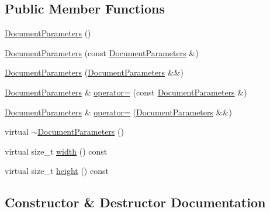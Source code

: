 \subsection*{Public Member Functions}
\begin{DoxyCompactItemize}
\item 
\hyperlink{classGraphicalEditorCore_1_1DocumentParameters_a89df3a7acba401ec3c636d599d40341f}{Document\+Parameters} ()
\item 
\hyperlink{classGraphicalEditorCore_1_1DocumentParameters_ad34fb74cda0ad52bc38678875ce32c91}{Document\+Parameters} (const \hyperlink{classGraphicalEditorCore_1_1DocumentParameters}{Document\+Parameters} \&)
\item 
\hyperlink{classGraphicalEditorCore_1_1DocumentParameters_af797b5c95963fdafdd2253bb4d152c21}{Document\+Parameters} (\hyperlink{classGraphicalEditorCore_1_1DocumentParameters}{Document\+Parameters} \&\&)
\item 
\hyperlink{classGraphicalEditorCore_1_1DocumentParameters}{Document\+Parameters} \& \hyperlink{classGraphicalEditorCore_1_1DocumentParameters_a084ca6d2aafc7e65b401b2e62b0a16e4}{operator=} (const \hyperlink{classGraphicalEditorCore_1_1DocumentParameters}{Document\+Parameters} \&)
\item 
\hyperlink{classGraphicalEditorCore_1_1DocumentParameters}{Document\+Parameters} \& \hyperlink{classGraphicalEditorCore_1_1DocumentParameters_a947b1cc43448286d07300fd7b9eeb722}{operator=} (\hyperlink{classGraphicalEditorCore_1_1DocumentParameters}{Document\+Parameters} \&\&)
\item 
virtual \hyperlink{classGraphicalEditorCore_1_1DocumentParameters_a4ea3a0d935da5c124d9989fd686d6d70}{$\sim$\+Document\+Parameters} ()
\item 
virtual size\+\_\+t \hyperlink{classGraphicalEditorCore_1_1DocumentParameters_af84100459d1e49474e57e5b7b16f1750}{width} () const 
\item 
virtual size\+\_\+t \hyperlink{classGraphicalEditorCore_1_1DocumentParameters_ab28b51581bade5d1b1a4122b347995da}{height} () const 
\end{DoxyCompactItemize}


\subsection{Constructor \& Destructor Documentation}
